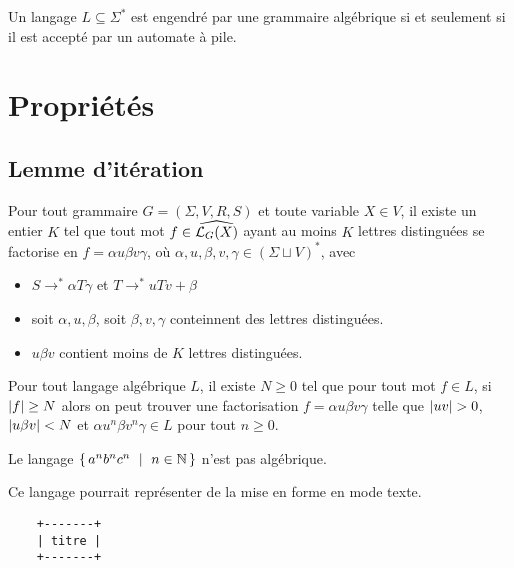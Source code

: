 \documentclass[../../agregation.tex]{subfiles}
\begin{document}
\begin{thm}
	Un langage $L\subseteq\Sigma^*$ est engendré par une grammaire algébrique si et seulement si il est accepté par un automate à pile.	
\end{thm}

\section{Propriétés}

\subsection{Lemme d'itération} %

\begin{lem}[Ogden]\label{th:ogden}
	Pour tout grammaire $G=(\Sigma,V,R,S)$ et toute variable $X\in V$, il existe un entier $K$ tel que tout mot $f\in \widehat{\mathcal{L}_G(X)}$ ayant au moins $K$ lettres distinguées se factorise en $f=\alpha u \beta v \gamma$, où $\alpha,u,\beta,v,\gamma\in (\Sigma\sqcup V)^*$, avec
	\begin{itemize}
		\item $S\to^*\alpha T \gamma$ et $T\to ^*uTv+\beta$
		\item soit $\alpha, u, \beta$, soit $\beta, v, \gamma$ conteinnent des lettres distinguées.
		\item $u\beta v$ contient moins de $K$ lettres distinguées.
	\end{itemize}
\end{lem}

\begin{cor}\label{th:bhs}
	Pour tout langage algébrique $L$, il existe $N\ge 0$ tel que pour tout mot $f\in L$, si $\left|f\right|\ge N$ alors on peut trouver une factorisation $f=\alpha u \beta v \gamma$ telle que $\abs{uv}>0$, $\left|u\beta v\right|<N$ et $\alpha u^n \beta v^n \gamma\in L$ pour tout $n\ge 0$.	
\end{cor}

\begin{application}
	Le langage $\set{a^{n}b^{n}c^{n}\ |\ n\in\N}$ n'est pas algébrique.
\end{application}

\begin{example}
	Ce langage pourrait représenter de la mise en forme en mode texte. \begin{lstlisting}
	+-------+
	| titre |
	+-------+
	\end{lstlisting}
\end{example}
\end{document}
